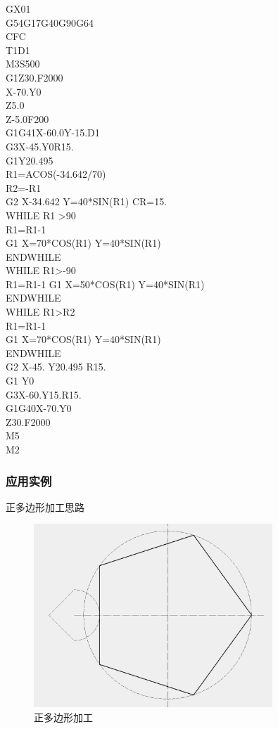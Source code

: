GX01 \\
G54G17G40G90G64\\
CFC\\
T1D1\\
M3S500\\
G1Z30.F2000\\
X-70.Y0\\
Z5.0\\
Z-5.0F200\\
G1G41X-60.0Y-15.D1\\
G3X-45.Y0R15.\\
G1Y20.495\\
R1=ACOS(-34.642/70)\\
R2=-R1\\
G2 X-34.642  Y=40*SIN(R1)  CR=15.\\
WHILE  R1 >90\\
R1=R1-1\\
G1 X=70*COS(R1)  Y=40*SIN(R1)\\
ENDWHILE\\
WHILE  R1>-90\\
R1=R1-1
G1 X=50*COS(R1)  Y=40*SIN(R1)\\
ENDWHILE\\
WHILE  R1>R2\\
R1=R1-1\\
G1 X=70*COS(R1)  Y=40*SIN(R1)\\
ENDWHILE\\
G2 X-45. Y20.495 R15.\\
G1 Y0\\
G3X-60.Y15.R15.\\
G1G40X-70.Y0\\
Z30.F2000\\
M5\\
M2\\

\subsubsection{应用实例}
正多边形加工思路

	\begin{figure}
	\centering	\includegraphics[width=0.8\textwidth]{images/5-2.jpg}
	\caption{正多边形加工} \label{正多边形加工}
\end{figure}

